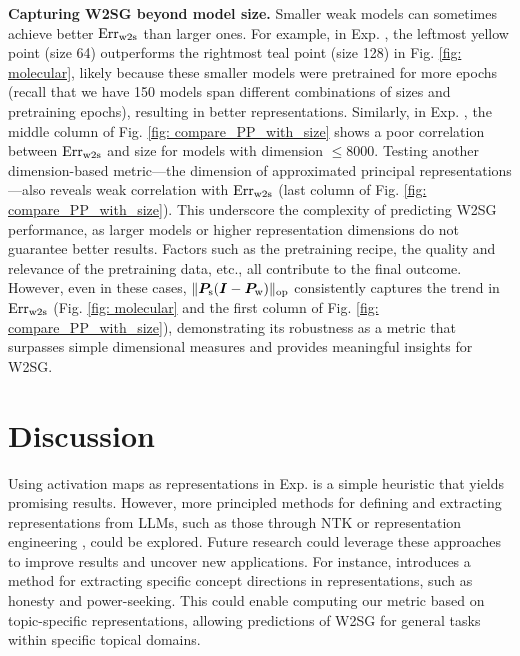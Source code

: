 \textbf{Capturing W2SG beyond model size.} {Smaller weak models can sometimes achieve better $\text{Err}_{\text{w2s}}$ than larger ones. For example, in Exp. , the leftmost yellow point (size 64) outperforms the rightmost teal point (size 128) in Fig. \ref{fig: molecular}, likely because these smaller models were pretrained for more epochs 
(recall that we have 150 models span different combinations of sizes and pretraining epochs), resulting in better representations. 
Similarly, in Exp. , the middle column of Fig. \ref{fig: compare_PP_with_size} shows a poor correlation between $\text{Err}_{\text{w2s}}$ and size for models with dimension $\leq 8000$.  Testing another dimension-based metric—the dimension of approximated principal representations—also reveals weak correlation with $\text{Err}_{\text{w2s}}$ (last column of Fig. \ref{fig: compare_PP_with_size}). This underscore the complexity of predicting W2SG performance, as larger models or higher representation dimensions do not guarantee better results. Factors such as the pretraining recipe, the quality and relevance of the pretraining data, etc., all contribute to the final outcome. However, even in these cases, $\lVert  {\bm{P}}_{\text{s}}({\bm{I}}-{\bm{P}}_{\text{w}})  \rVert_{\mathrm{op}}$ consistently captures the trend in $\text{Err}_{\text{w2s}}$ (Fig. \ref{fig: molecular} and the first column of Fig. \ref{fig: compare_PP_with_size}), demonstrating its robustness as a metric that surpasses simple dimensional measures and provides meaningful insights for W2SG.}
\vspace{-0cm}


\section{Discussion}\label{apdx: discussion}

Using activation maps as representations in Exp.  is a simple heuristic that yields promising results. However, more principled methods for defining and extracting representations from LLMs, such as those through NTK \cite{malladi2023kernel} or representation engineering \cite{zou2023representation}, could be explored. Future research could leverage these approaches to improve results and uncover new applications. For instance, \cite{zou2023representation} introduces a method for extracting specific concept directions in representations, such as honesty and power-seeking. This could enable computing our metric based on topic-specific representations, allowing predictions of W2SG for general tasks within specific topical domains.
 

